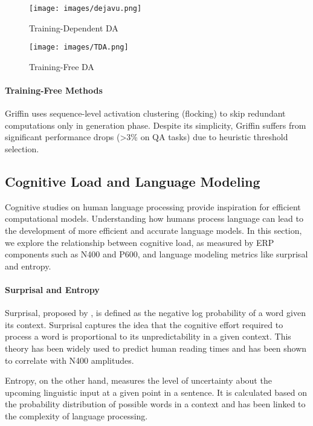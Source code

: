 \begin{figure*}[htbp]
    \begin{minipage}[t]{0.5\linewidth}
        \centering
        \texttt{[image: images/dejavu.png]}
        \caption{Training-Dependent DA}
        \label{figure:Training-Dependent DA}
    \end{minipage}
    \begin{minipage}[t]{0.5\linewidth}
        \centering
        \texttt{[image: images/TDA.png]}
        \caption{Training-Free DA}
        \label{figure:Training-Free TDA}
    \end{minipage}%
\end{figure*}
     
\paragraph{Training-Free Methods}
Griffin\cite{dong2024promptpromptedadaptivestructuredpruning} uses sequence-level activation clustering (flocking) to skip redundant computations only in generation phase. Despite its simplicity, Griffin suffers from significant performance drops (>3\% on QA tasks) due to heuristic threshold selection.

\subsection{Cognitive Load and Language Modeling}
Cognitive studies on human language processing provide inspiration for efficient computational models. Understanding how humans process language can lead to the development of more efficient and accurate language models. In this section, we explore the relationship between cognitive load, as measured by ERP components such as N400 and P600, and language modeling metrics like surprisal and entropy.

\paragraph{Surprisal and Entropy}
Surprisal, proposed by \citet{hale-2001-probabilistic}, is defined as the negative log probability of a word given its context. Surprisal captures the idea that the cognitive effort required to process a word is proportional to its unpredictability in a given context. This theory has been widely used to predict human reading times and has been shown to correlate with N400 amplitudes\cite{salicchi-hsu-2025-every}.

Entropy\cite{oh2024frequencyexplainsinversecorrelation}, on the other hand, measures the level of uncertainty about the upcoming linguistic input at a given point in a sentence. It is calculated based on the probability distribution of possible words in a context and has been linked to the complexity of language processing.